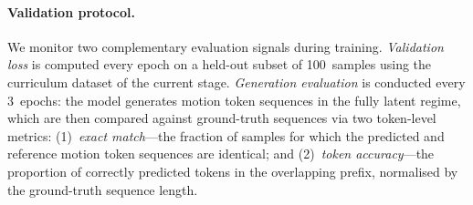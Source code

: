 \paragraph{Validation protocol.}
We monitor two complementary evaluation signals during training.
\emph{Validation loss} is computed every epoch on a held-out subset of
100~samples using the curriculum dataset of the current stage.
\emph{Generation evaluation} is conducted every 3~epochs: the model
generates motion token sequences in the fully latent regime, which are
then compared against ground-truth sequences via two token-level metrics:
(1)~\emph{exact match}---the fraction of samples for which the predicted
and reference motion token sequences are identical; and
(2)~\emph{token accuracy}---the proportion of correctly predicted tokens
in the overlapping prefix, normalised by the ground-truth sequence length.


%
%

